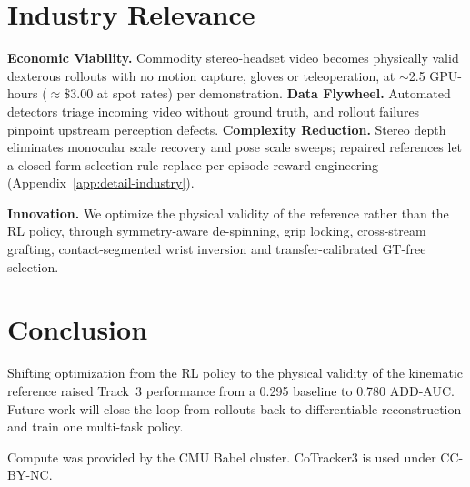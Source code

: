 \documentclass[10pt]{nvidiaextabstract}
\begin{document}
\section{Industry Relevance}
\label{sec:industry}

\textbf{Economic Viability.} Commodity stereo-headset video becomes physically valid dexterous rollouts with no motion capture, gloves or teleoperation, at $\sim$2.5 GPU-hours ($\approx\$3.00$ at spot rates) per demonstration.
\textbf{Data Flywheel.} Automated detectors triage incoming video without ground truth, and rollout failures pinpoint upstream perception defects.
\textbf{Complexity Reduction.} Stereo depth eliminates monocular scale recovery and pose scale sweeps; repaired references let a closed-form selection rule replace per-episode reward engineering (Appendix~\ref{app:detail-industry}).

\textbf{Innovation.} We optimize the physical validity of the reference rather than the RL policy, through symmetry-aware de-spinning, grip locking, cross-stream grafting, contact-segmented wrist inversion and transfer-calibrated GT-free selection.

\section{Conclusion}
\label{sec:conclusion}

Shifting optimization from the RL policy to the physical validity of the kinematic reference raised Track~3 performance from a 0.295 baseline to 0.780 ADD-AUC. Future work will close the loop from rollouts back to differentiable reconstruction and train one multi-task policy.

\begin{acks}
Compute was provided by the CMU Babel cluster. CoTracker3 is used under CC-BY-NC.
\end{acks}




\appendix
\end{document}
